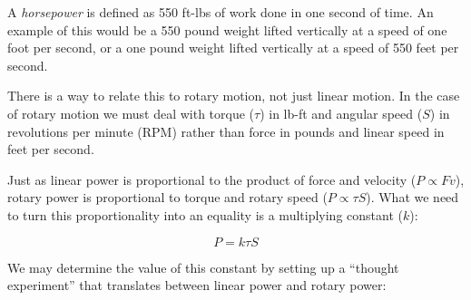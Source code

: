 

A {\it horsepower} is defined as 550 ft-lbs of work done in one second of time.  An example of this would be a 550 pound weight lifted vertically at a speed of one foot per second, or a one pound weight lifted vertically at a speed of 550 feet per second.

There is a way to relate this to rotary motion, not just linear motion.  In the case of rotary motion we must deal with torque ($\tau$) in lb-ft and angular speed ($S$) in revolutions per minute (RPM) rather than force in pounds and linear speed in feet per second.

Just as linear power is proportional to the product of force and velocity ($P \propto F v$), rotary power is proportional to torque and rotary speed ($P \propto \tau S$).  What we need to turn this proportionality into an equality is a multiplying constant ($k$):

$$P = k \tau S$$

We may determine the value of this constant by setting up a ``thought experiment'' that translates between linear power and rotary power:

